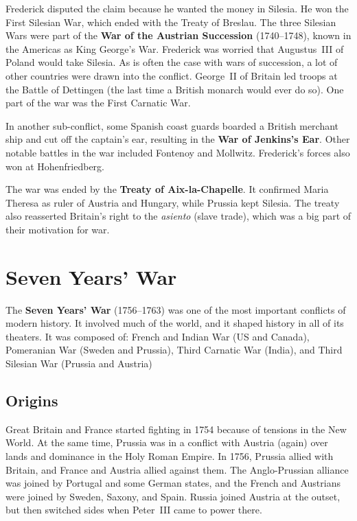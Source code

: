 Frederick disputed the claim because he wanted the money in Silesia.
He won the First Silesian War, which ended with the Treaty of Breslau.
The three Silesian Wars were part of the \textbf{War of the Austrian Succession} (1740--1748),
known in the Americas as King George's War.
Frederick was worried that Augustus~III of Poland would take Silesia.
As is often the case with wars of succession, a lot of other countries were drawn into the conflict.
George~II of Britain led troops at the Battle of Dettingen (the last time a British monarch would ever do so).
One part of the war was the First Carnatic War.

In another sub-conflict, some Spanish coast guards boarded a British merchant ship and cut off the captain's ear,
resulting in the \textbf{War of Jenkins's Ear}.
Other notable battles in the war included Fontenoy and Mollwitz.
Frederick's forces also won at Hohenfriedberg.

The war was ended by the \textbf{Treaty of Aix-la-Chapelle}.
It confirmed Maria Theresa as ruler of Austria and Hungary, while Prussia kept Silesia.
The treaty also reasserted Britain's right to the \textit{asiento} (slave trade),
which was a big part of their motivation for war.

\section{Seven Years' War}

The \textbf{Seven Years' War} (1756--1763) was one of the most important conflicts of modern history.
It involved much of the world, and it shaped history in all of its theaters.
It was composed of:
French and Indian War (US and Canada),
Pomeranian War (Sweden and Prussia),
Third Carnatic War (India),
and Third Silesian War (Prussia and Austria)

\subsection*{Origins}

Great Britain and France started fighting in 1754 because of tensions in the New World.
At the same time, Prussia was in a conflict with Austria (again) over lands and dominance in the Holy Roman Empire.
In 1756, Prussia allied with Britain, and France and Austria allied against them.
The Anglo-Prussian alliance was joined by Portugal and some German states,
and the French and Austrians were joined by Sweden, Saxony, and Spain.
Russia joined Austria at the outset, but then switched sides when Peter~III came to power there.

